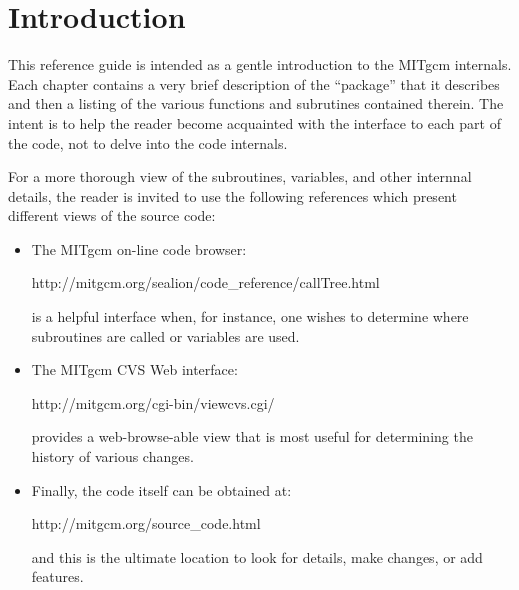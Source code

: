 %
%

\chapter{Introduction}

This reference guide is intended as a gentle introduction to the
MITgcm internals.  Each chapter contains a very brief description of
the ``package'' that it describes and then a listing of the various
functions and subrutines contained therein.  The intent is to help the
reader become acquainted with the interface to each part of the code,
not to delve into the code internals.

For a more thorough view of the subroutines, variables, and other
internnal details, the reader is invited to use the following
references which present different views of the source code:
\begin{itemize}
\item The MITgcm on-line code browser:
  \begin{center}
    {http://mitgcm.org/sealion/code_reference/callTree.html}
  \end{center}
  is a helpful interface when, for instance, one wishes to determine
  where subroutines are called or variables are used.

\item The MITgcm CVS Web interface:
  \begin{center}
    {http://mitgcm.org/cgi-bin/viewcvs.cgi/}
  \end{center}
  provides a web-browse-able view that is most useful for determining
  the history of various changes.

\item Finally, the code itself can be obtained at:
  \begin{center}
    {http://mitgcm.org/source_code.html}
  \end{center}
  and this is the ultimate location to look for details, make changes,
  or add features.

\end{itemize}

